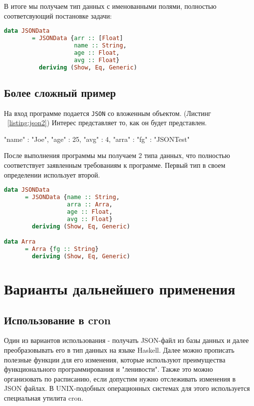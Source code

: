 В итоге мы получаем тип данных с именованными полями, полностью соответсвующий постановке задачи:

\begin{lstlisting}[language=Haskell]
data JSONData 
        = JSONData {arr :: [Float]
                    name :: String,
                    age :: Float,
                    avg :: Float}
          deriving (Show, Eq, Generic)
\end{lstlisting}

\section{Более сложный пример}

На вход программе подается \lstinline{JSON} со вложенным объектом. (Листинг ~\ref{listing:json2})  Интерес представляет то, как он будет представлен. 

\begin{ListingEnv}[H]
\begin{Verb}
{
    "name" : "Joe",
    "age" : 25,
    "avg" : 4,
    "arra" : 
             {
                 "fg" : "JSONTest"  
             }
}
\end{Verb}
\label{listing:json2}
\end{ListingEnv}

После выполнения программы мы получаем 2 типа данных, что полностью соответствует заявленным требованиям к программе. Первый тип в своем определении использует второй. 

\begin{lstlisting}[language=Haskell]
data JSONData
      = JSONData {name :: String,
                  arra :: Arra,
                  age :: Float,
                  avg :: Float}
        deriving (Show, Eq, Generic)

data Arra
      = Arra {fg :: String}
        deriving (Show, Eq, Generic)            
\end{lstlisting}

\chapter{Варианты дальнейшего применения}

\section{Использование в cron}

Один из вариантов использования - получать JSON-файл из базы данных и далее преобразовывать его в тип данных на языке Haskell. Далее можно прописать полезные функции для его изменения, которые используют преимущества функционального программирования и "ленивости". Также это можно организовать по расписанию, если допустим нужно отслеживать изменения в JSON файлах. В UNIX-подобных операционных системах для этого используется специальная утилита cron.


